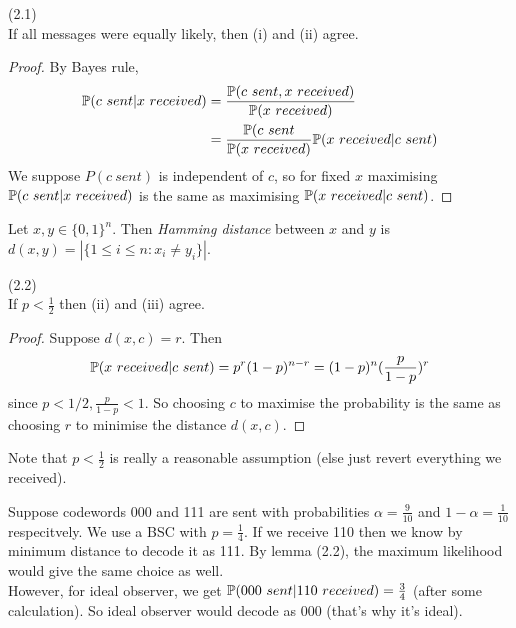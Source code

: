 \documentclass[a4paper]{article}
\begin{document}
\begin{lemma}(2.1)\\
If all messages were equally likely, then (i) and (ii) agree.
\begin{proof}
By Bayes rule,
\begin{equation*}
\begin{aligned}
\P(c\ sent|x\ received) &= \frac{\P(c\ sent, x\ received)}{\P(x\ received)}\\
&= \frac{\P(c\ sent}{\P(x\ received)} \P(x\ received | c\ sent)
\end{aligned}
\end{equation*}
We suppose $P(c\ sent)$ is independent of $c$, so for fixed $x$ maximising $\P(c\ sent| x\ received)$ is the same as maximising $\P(x\ received | c\ sent)$.
\end{proof}
\end{lemma}

\begin{defi}
Let $x,y \in \{0,1\}^n$. Then \emph{Hamming distance} between $x$ and $y$ is $d(x,y) = |\{1\leq i \leq n: x_i \neq y_i\}|$.
\end{defi}

\begin{lemma} (2.2)\\
If $p < \frac{1}{2}$ then (ii) and (iii) agree.
\begin{proof}
Suppose $d(x,c) = r$. Then
\begin{equation*}
\begin{aligned}
\P(x\ received | c\ sent) = p^r (1-p)^{n-r} = (1-p)^n (\frac{p}{1-p})^r
\end{aligned}
\end{equation*}
since $p<1/2, \frac{p}{1-p} < 1$. So choosing $c$ to maximise the probability is the same as choosing $r$ to minimise the distance $d(x,c)$.
\end{proof}
\end{lemma}

Note that $p<\frac{1}{2}$ is really a reasonable assumption (else just revert everything we received).

\begin{eg}
Suppose codewords 000 and 111 are sent with probabilities $\alpha = \frac{9}{10}$ and $1-\alpha = \frac{1}{10}$ respecitvely. We use a BSC with $p=\frac{1}{4}$. If we receive 110 then we know by minimum distance to decode it as 111. By lemma (2.2), the maximum likelihood would give the same choice as well.\\
However, for ideal observer, we get $\P(000\ sent | 110\ received) = \frac{3}{4}$ (after some calculation). So ideal observer would decode as 000 (that's why it's ideal).
\end{eg}
\end{document}
